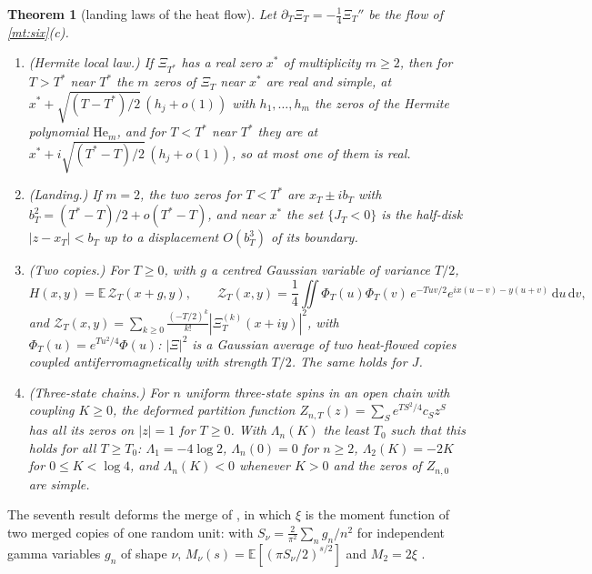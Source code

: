 \documentclass[11pt]{article}
\newtheorem{theorem}{Theorem}[section]
\theoremstyle{definition}\newtheorem{definition}[theorem]{Definition}
\theoremstyle{remark}\newtheorem{remark}[theorem]{Remark}
\newcommand{\dd}{\,\mathrm d}\newcommand{\e}{\mathrm e}
\begin{document}
\begin{theorem}[landing laws of the heat flow]\label{mt:heat}
Let $\partial_T\Xi_T=-\frac14\Xi_T''$ be the flow of \cref{mt:six}(c).
\begin{enumerate}[label=(\roman*)]
\item \emph{(Hermite local law.)} If $\Xi_{T^*}$ has a real zero $x^*$ of multiplicity $m\ge2$, then for $T>T^*$ near $T^*$ the $m$ zeros of $\Xi_T$ near $x^*$ are real and simple, at $x^*+\sqrt{(T-T^*)/2}\,(h_j+o(1))$ with $h_1,\dots,h_m$ the zeros of the Hermite polynomial $\mathrm{He}_m$, and for $T<T^*$ near $T^*$ they are at $x^*+i\sqrt{(T^*-T)/2}\,(h_j+o(1))$, so at most one of them is real.
\item \emph{(Landing.)} If $m=2$, the two zeros for $T<T^*$ are $x_T\pm ib_T$ with $b_T^2=(T^*-T)/2+o(T^*-T)$, and near $x^*$ the set $\{J_T<0\}$ is the half-disk $|z-x_T|<b_T$ up to a displacement $O(b_T^3)$ of its boundary.
\item \emph{(Two copies.)} For $T\ge0$, with $g$ a centred Gaussian variable of variance $T/2$,
\[
H(x,y)=\mathbb E\,\mathcal Z_T(x+g,y),\qquad \mathcal Z_T(x,y)=\frac14\iint\Phi_T(u)\Phi_T(v)\,e^{-Tuv/2}e^{ix(u-v)-y(u+v)}\dd u\dd v,
\]
and $\mathcal Z_T(x,y)=\sum_{k\ge0}\frac{(-T/2)^k}{k!}|\Xi_T^{(k)}(x+iy)|^2$,
with $\Phi_T(u)=e^{Tu^2/4}\Phi(u)$: $|\Xi|^2$ is a Gaussian average of two heat-flowed copies coupled antiferromagnetically with strength $T/2$. The same holds for $J$.
\item \emph{(Three-state chains.)} For $n$ uniform three-state spins in an open chain with coupling $K\ge0$, the deformed partition function $Z_{n,T}(z)=\sum_Se^{TS^2/4}c_Sz^S$ has all its zeros on $|z|=1$ for $T\ge0$. With $\Lambda_n(K)$ the least $T_0$ such that this holds for all $T\ge T_0$: $\Lambda_1=-4\log2$, $\Lambda_n(0)=0$ for $n\ge2$, $\Lambda_2(K)=-2K$ for $0\le K<\log4$, and $\Lambda_n(K)<0$ whenever $K>0$ and the zeros of $Z_{n,0}$ are simple.
\end{enumerate}
\end{theorem}

The seventh result deforms the merge of \cite{S01}, in which $\xi$ is the moment function of two merged copies of one random unit: with $S_\nu=\frac2{\pi^2}\sum_ng_n/n^2$ for independent gamma variables $g_n$ of shape $\nu$, $M_\nu(s)=\mathbb E[(\pi S_\nu/2)^{s/2}]$ and $M_2=2\xi$ \cite{BPY}.
\end{document}
